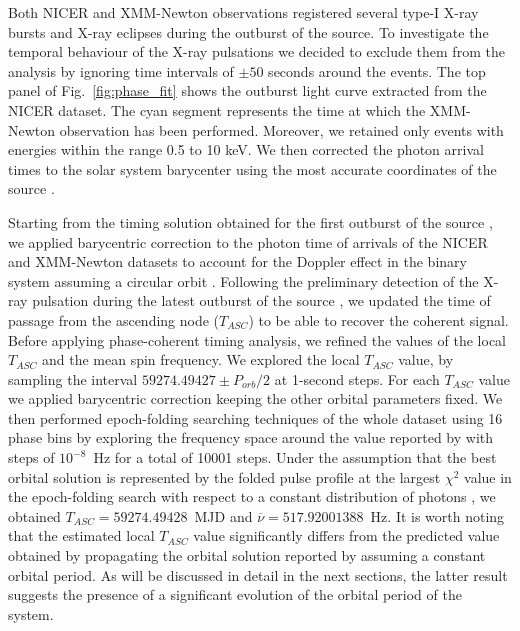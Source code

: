 \documentclass[fleqn,usenatbib]{mnras}
\newcommand{\nicer}{NICER}
\newcommand{\xmm}{XMM-Newton}
\begin{document}
Both NICER and XMM-Newton observations registered several type-I X-ray bursts and X-ray eclipses during the outburst of the source. To investigate the temporal behaviour of the X-ray pulsations we decided to exclude them from the analysis by ignoring time intervals of $\pm 50$ seconds around the events. The top panel of Fig.~\ref{fig:phase_fit} shows the outburst light curve extracted from the \nicer{} dataset. The cyan segment represents the time at which the \xmm{} observation has been performed. Moreover, we retained only events with energies within the range 0.5 to 10 keV. We then corrected the photon arrival times to the solar system barycenter using the most accurate coordinates of the source \citep{Jonker:2013wp}.

Starting from the timing solution obtained for the first outburst of the source \citep{Markwardt:2010tl}, we applied barycentric correction to the photon time of arrivals of the \nicer{} and \xmm{} datasets to account for the Doppler effect in the binary system assuming a circular orbit \citep[see e.g.,][for a detailed description of the method]{Burderi:2007tl,Sanna:2016ty}. Following the preliminary detection of the X-ray pulsation during the latest outburst of the source \citep{Bult:2021wk}, we updated the time of passage from the ascending node ($T_{ASC}$) to be able to recover the coherent signal. Before applying phase-coherent timing analysis, we refined the values of the local $T_{ASC}$ and the mean spin frequency. We explored the local $T_{ASC}$ value, by sampling the interval $59274.49427\pm P_{orb}/2$ at 1-second steps. For each $T_{ASC}$ value we applied barycentric correction keeping the other orbital parameters fixed. We then performed epoch-folding searching techniques of the whole dataset using 16 phase bins by exploring the frequency space around the value reported by \citet{Bult:2021wk} with steps of $10^{-8}$~Hz for a total of 10001 steps. Under the assumption that the best orbital solution is represented by the folded pulse profile at the largest $\chi^2$ value in the epoch-folding search with respect to a constant distribution of photons \citep[see
e.g.,][]{Kirsch:2004tg}, we obtained $T_{ASC}=59274.49428$~MJD and $\overline{\nu}=517.92001388$~Hz.
It is worth noting that the estimated local $T_{ASC}$ value significantly differs from the predicted value obtained by propagating the orbital solution reported by \citep{Markwardt:2010tl} assuming a constant orbital period. As will be discussed in detail in the next sections, the latter result suggests the presence of a significant evolution of the orbital period of the system.
\end{document}
